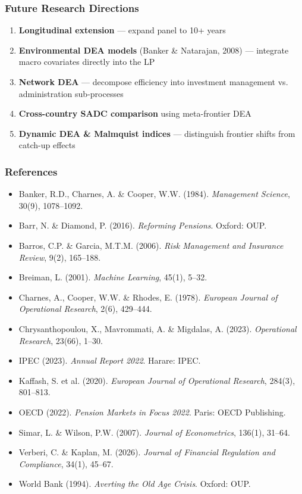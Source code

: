 \documentclass{beamer}
\begin{document}
\begin{frame}
    \frametitle{Future Research Directions}
    \begin{enumerate}
        \item \textbf{Longitudinal extension} --- expand panel to 10+ years
        \item \textbf{Environmental DEA models} (Banker \& Natarajan, 2008) --- integrate macro covariates directly into the LP
        \item \textbf{Network DEA} --- decompose efficiency into investment management vs. administration sub-processes
        \item \textbf{Cross-country SADC comparison} using meta-frontier DEA
        \item \textbf{Dynamic DEA \& Malmquist indices} --- distinguish frontier shifts from catch-up effects
    \end{enumerate}
\end{frame}

\begin{frame}
    \frametitle{References}
    \tiny
    \begin{itemize}
        \item Banker, R.D., Charnes, A. \& Cooper, W.W. (1984). \textit{Management Science}, 30(9), 1078--1092.
        \item Barr, N. \& Diamond, P. (2016). \textit{Reforming Pensions}. Oxford: OUP.
        \item Barros, C.P. \& Garcia, M.T.M. (2006). \textit{Risk Management and Insurance Review}, 9(2), 165--188.
        \item Breiman, L. (2001). \textit{Machine Learning}, 45(1), 5--32.
        \item Charnes, A., Cooper, W.W. \& Rhodes, E. (1978). \textit{European Journal of Operational Research}, 2(6), 429--444.
        \item Chrysanthopoulou, X., Mavrommati, A. \& Migdalas, A. (2023). \textit{Operational Research}, 23(66), 1--30.
        \item IPEC (2023). \textit{Annual Report 2022}. Harare: IPEC.
        \item Kaffash, S. et al. (2020). \textit{European Journal of Operational Research}, 284(3), 801--813.
        \item OECD (2022). \textit{Pension Markets in Focus 2022}. Paris: OECD Publishing.
        \item Simar, L. \& Wilson, P.W. (2007). \textit{Journal of Econometrics}, 136(1), 31--64.
        \item Verberi, C. \& Kaplan, M. (2026). \textit{Journal of Financial Regulation and Compliance}, 34(1), 45--67.
        \item World Bank (1994). \textit{Averting the Old Age Crisis}. Oxford: OUP.
    \end{itemize}
\end{frame}
\end{document}
